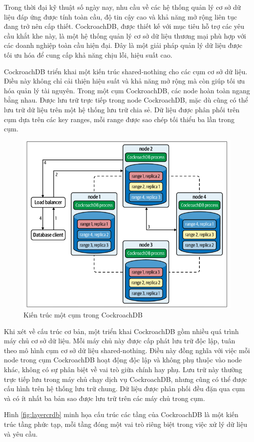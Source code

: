 \documentclass[14pt]{article}
\begin{document}
Trong thời đại kỹ thuật số ngày nay, nhu cầu về các hệ thống quản lý cơ sở dữ liệu đáp ứng được tính toàn cầu, độ tin cậy cao và khả năng mở rộng liên tục đang trở nên cấp thiết. CockroachDB, được thiết kế với mục tiêu hỗ trợ các yêu cầu khắt khe này, là một hệ thống quản lý cơ sở dữ liệu thương mại phù hợp với các doanh nghiệp toàn cầu hiện đại. Đây là một giải pháp quản lý dữ liệu được tối ưu hóa để cung cấp khả năng chịu lỗi, hiệu suất cao.

CockroachDB triển khai một kiến trúc shared-nothing cho các cụm cơ sở dữ liệu. Điều này không chỉ cải thiện hiệu suất và khả năng mở rộng mà còn giúp tối ưu hóa quản lý tài nguyên. Trong một cụm CockroachDB, các node hoàn toàn ngang bằng nhau. Được lưu trữ trực tiếp trong node CockroachDB, mặc dù cũng có thể lưu trữ dữ liệu trên một hệ thống lưu trữ chia sẻ. Dữ liệu được phân phối trên cụm dựa trên các key ranges, mỗi range được sao chép tối thiểu ba lần trong cụm.

\begin{figure}
    \centering
    \includegraphics[width=0.5\linewidth]{images/CockroachdbArc.png}
    \caption{Kiến trúc một cụm trong CockroachDB \cite{CockroachDBGuide}}
    \label{fig:CockroachdbArc}
\end{figure}


Khi xét về cấu trúc cơ bản, một triển khai CockroachDB gồm nhiều quá trình máy chủ cơ sở dữ liệu. Mỗi máy chủ này được cấp phát lưu trữ độc lập, tuân theo mô hình cụm cơ sở dữ liệu shared-nothing. Điều này đồng nghĩa với việc mỗi node trong cụm CockroachDB hoạt động độc lập và không phụ thuộc vào node khác, không có sự phân biệt về vai trò giữa chính hay phụ. Lưu trữ này thường trực tiếp lưu trong máy chủ chạy dịch vụ CockroachDB, nhưng cũng có thể được cấu hình trên hệ thống lưu trữ chung. Dữ liệu được phân phối đều đặn qua cụm và có ít nhất ba bản sao được lưu trữ trên các máy chủ trong cụm.


Hình \ref{fig:layercrdb} minh họa cấu trúc các tầng của CockroachDB là một kiến trúc tầng phức tạp, mỗi tầng đóng một vai trò riêng biệt trong việc xử lý dữ liệu và yêu cầu.
\end{document}
